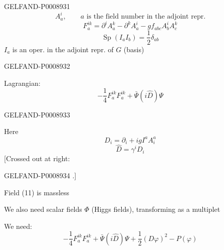 \begin{GelfandAdjacentEvidence}{GELFAND-P000893}{1}
\begin{equation*}
A_a^i,\qquad a\text{ is the field number in the adjoint repr.} \tag{8}
\end{equation*}
\begin{equation*}
F_a^{ik}=\partial^i A_a^k-\partial^k A_a^i-gf_{abc}A_b^iA_c^k \tag{9}
\end{equation*}
\begin{equation*}
\operatorname{Sp}(I_aI_b)=\frac12\delta_{ab} \tag{10}
\end{equation*}
$I_a$ is an oper. in the adjoint repr. of $G$ (basis)
\end{GelfandAdjacentEvidence}
\begin{GelfandAdjacentEvidence}{GELFAND-P000893}{2}


Lagrangian:
\begin{equation*}
-\frac14 F_a^{ik}F_a^{ik}+\bar\Psi(i\hat D)\Psi \tag{11}
\end{equation*}
\end{GelfandAdjacentEvidence}
\begin{GelfandAdjacentEvidence}{GELFAND-P000893}{3}


Here
\begin{equation*}
D_i=\partial_i+igI^aA_i^a \tag{12}
\end{equation*}
\begin{equation*}
\hat D=\gamma^iD_i \tag*{$(12)_2$}
\end{equation*}
[Crossed out at right: 
\end{GelfandAdjacentEvidence}
\begin{GelfandAdjacentEvidence}{GELFAND-P000893}{4}
.]

Field (11) is massless

We also need scalar fields $\Phi$ (Higgs fields), transforming as a multiplet

We need:
\begin{equation*}
-\frac14 F_a^{ik}F_a^{ik}+\bar\Psi(i\hat D)\Psi
+\frac12(D\varphi)^2-P(\varphi) \tag{13}
\end{equation*}
\end{GelfandAdjacentEvidence}

